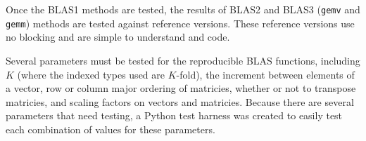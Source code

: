   Once the BLAS1 methods are tested, the results of BLAS2 and BLAS3 (\texttt{gemv} and \texttt{gemm}) methods are tested against reference versions. These reference versions use no blocking and are simple to understand and code.

  Several parameters must be tested for the reproducible BLAS functions, including $K$ (where the indexed types used are $K$-fold), the increment between elements of a vector, row or column major ordering of matricies, whether or not to transpose matricies, and scaling factors on vectors and matricies. Because there are several parameters that need testing, a Python test harness was created to easily test each combination of values for these parameters.
